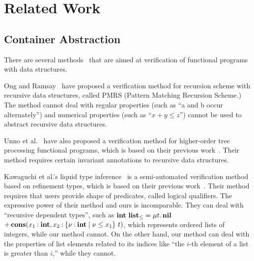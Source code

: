\section{Related Work}
\label{sec:related}

\subsection{Container Abstraction}
There are several
methods~\cite{Ong2011,Kobayashi2010,Unno2010,Rondon2008,Kawaguchi2009,Chin2003}
that are aimed at verification of functional programs with data
structures.

Ong and Ramsay~\cite{Ong2011} have proposed a verification method
for recursion scheme with recursive data structures, called PMRS (Pattern
Matching Recursion Scheme.)  The method
cannot deal with regular properties (such as ``a and b occur
alternately'') and numerical properties (such as ``$x+y \leq z$'') cannot be used
to abstract recursive data structures.

Unno et al.~\cite{Unno2010} have also proposed a verification method for
higher-order tree processing functional programs, which is based on
their previous work~\cite{Kobayashi2010}. Their method requires certain
invariant annotations to recursive data structures.

Kawaguchi et al.'s liquid type inference~\cite{Kawaguchi2009} is a
semi-automated verification method based on refinement types, which is
based on their previous work~\cite{Rondon2008}.  Their method requires
that users provide shape of predicates, called logical qualifiers.  The
expressive power of their method and ours is incomparable.  They can
deal with ``recursive dependent types'', such as ${\mathbf{int}}~{\mathbf{list}_\leq}
= \mu t.\, \mathbf{nil}$ $\mathop{+}
\mathbf{cons}({x_1\mathbin{:}\mathbf{int}},{x_2\mathbin{:}{\{\nu\mathbin{:}\mathbf{int} \mid \nu \leq x_1\}}~{t}})$,
which represents ordered lists of integers, while our method cannot. On
the other hand, our method can deal with the properties of list elements
related to its indices like ``the $i$-th element of a list is greater
than $i$,'' while they cannot.

